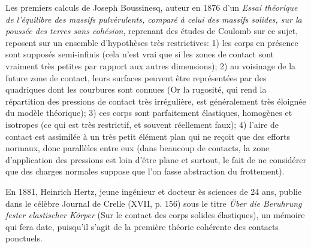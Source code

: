 \medskip
\begin{histoire}%
Les premiers calculs de Joseph Boussinesq, auteur en 1876 d'un \emph{Essai théorique de l'équilibre des massifs pulvérulents, comparé à celui des massifs solides, sur la poussée des terres sans cohésion}, reprenant des études de Coulomb sur ce sujet, reposent sur un ensemble d'hypothèses très restrictives:
1) les corps en présence sont supposés semi-infinis (cela n'est vrai que si les zones de contact sont vraiment très petites par rapport aux autres dimensions);
2) au voisinage de la future zone de contact, leurs surfaces peuvent être représentées par des quadriques dont les courbures sont connues (Or la rugosité, qui rend la répartition des pressions de contact très irrégulière, est généralement très éloignée du modèle théorique);
3) ces corps sont parfaitement élastiques, homogènes et isotropes (ce qui est très restrictif, et souvent réellement faux);
4) l'aire de contact est assimilée à un très petit élément plan qui ne reçoit que des efforts normaux, donc parallèles entre eux (dans beaucoup de contacts, la zone d'application des pressions est loin d'être plane et surtout, le fait de ne considérer que des charges normales suppose que l'on fasse abstraction du frottement).

\medskip
En 1881, Heinrich Hertz, jeune ingénieur et docteur ès sciences de 24 ans, publie dans le célèbre Journal de Crelle (XVII, p. 156) sous le titre \emph{Über die Beruhrung fester elastischer Körper} (Sur le contact des corps solides élastiques), un mémoire qui fera date, puisqu'il s'agit de la première théorie cohérente des contacts ponctuels.

\medskip
{}


\end{histoire}
